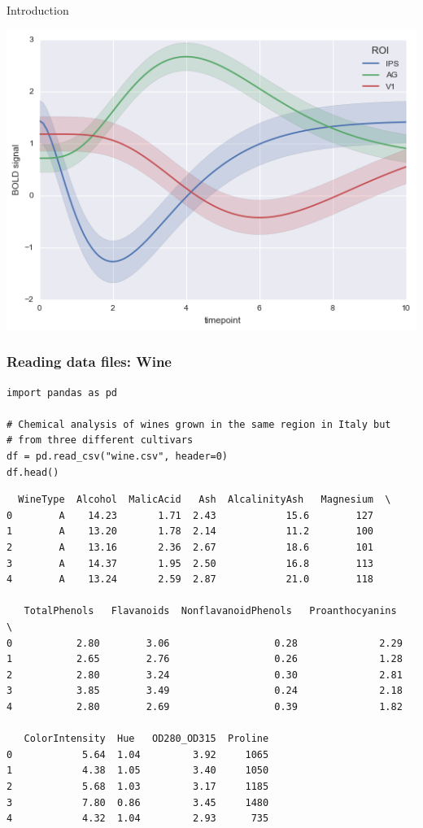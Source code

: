 \documentclass[xcolor=table]{beamer}
\begin{document}
\begin{frame}{Introduction}
\begin{center}
	\includegraphics[width=.3\textwidth]{sdemo6.png}\hfill
\end{center}

\end{frame}

\begin{frame}[fragile]
\frametitle{Reading data files: Wine}

\begin{lstlisting}[style=python]
import pandas as pd

# Chemical analysis of wines grown in the same region in Italy but 
# from three different cultivars
df = pd.read_csv("wine.csv", header=0)
df.head()
\end{lstlisting}

\vspace{-0.8cm}
{\fontsize{5}{6}\selectfont
\begin{verbatim}
  WineType  Alcohol  MalicAcid   Ash  AlcalinityAsh   Magnesium  \
0        A    14.23       1.71  2.43            15.6        127   
1        A    13.20       1.78  2.14            11.2        100   
2        A    13.16       2.36  2.67            18.6        101   
3        A    14.37       1.95  2.50            16.8        113   
4        A    13.24       2.59  2.87            21.0        118   

   TotalPhenols   Flavanoids  NonflavanoidPhenols   Proanthocyanins   \
0           2.80        3.06                  0.28              2.29   
1           2.65        2.76                  0.26              1.28   
2           2.80        3.24                  0.30              2.81   
3           3.85        3.49                  0.24              2.18   
4           2.80        2.69                  0.39              1.82   

   ColorIntensity  Hue   OD280_OD315  Proline  
0            5.64  1.04         3.92     1065  
1            4.38  1.05         3.40     1050  
2            5.68  1.03         3.17     1185  
3            7.80  0.86         3.45     1480  
4            4.32  1.04         2.93      735
\end{verbatim}}

\end{frame}
\end{document}
